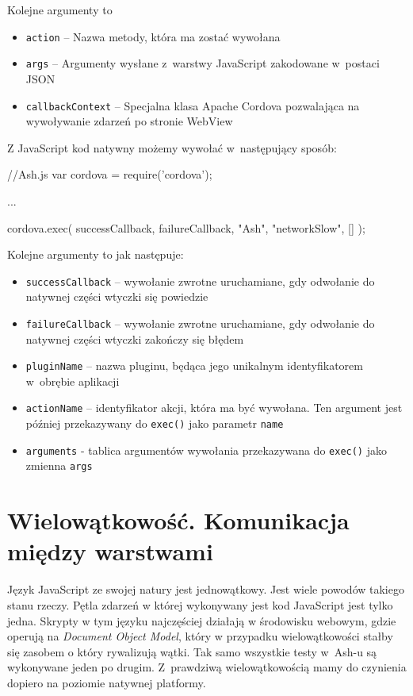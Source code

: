 \documentclass{xmgr}
\begin{document}
Kolejne argumenty to
\begin{itemize}
  \item \texttt{action} -- Nazwa metody, która ma zostać wywołana
  \item \texttt{args} -- Argumenty wysłane z~warstwy JavaScript zakodowane w~postaci JSON
  \item \texttt{callbackContext} -- Specjalna klasa Apache Cordova pozwalająca na wywoływanie zdarzeń po stronie WebView 
\end{itemize}

Z JavaScript kod natywny możemy wywołać w~następujący sposób:

\begin{javascriptcode}
//Ash.js
var cordova = require('cordova');

...

cordova.exec( 
        successCallback,
        failureCallback, 
        "Ash", 
        "networkSlow", 
        []
);
\end{javascriptcode}

Kolejne argumenty to jak następuje:
\begin{itemize}
  \item \texttt{successCallback} -- wywołanie zwrotne uruchamiane, gdy odwołanie do natywnej części wtyczki się powiedzie
  \item \texttt{failureCallback} -- wywołanie zwrotne uruchamiane, gdy odwołanie do natywnej części wtyczki zakończy się błędem
  \item \texttt{pluginName} -- nazwa pluginu, będąca jego unikalnym identyfikatorem w~obrębie aplikacji
  \item \texttt{actionName} -- identyfikator akcji, która ma być wywołana. Ten argument jest później przekazywany do \texttt{exec()} jako parametr \texttt{name} 
\item \texttt{arguments} - tablica argumentów wywołania przekazywana do \texttt{exec()} jako zmienna \texttt{args} 
\end{itemize}

\section{Wielowątkowość. Komunikacja między warstwami}

Język JavaScript ze swojej natury jest jednowątkowy. Jest wiele powodów takiego stanu rzeczy. Pętla zdarzeń w której wykonywany jest kod JavaScript jest tylko jedna. Skrypty w tym języku najczęściej działają w środowisku webowym, gdzie operują na \textit{Document Object Model}, który w przypadku wielowątkowości stałby się zasobem o który rywalizują wątki. Tak samo wszystkie testy w~Ash-u są wykonywane jeden po drugim.  Z~prawdziwą wielowątkowością mamy do czynienia dopiero na poziomie natywnej platformy.
\end{document}
